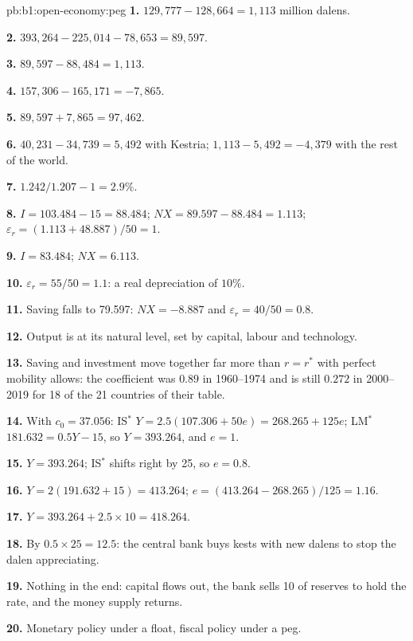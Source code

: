 \begin{solution}{pb:b1:open-economy:peg}
\textbf{1.} $129{,}777 - 128{,}664 = 1{,}113$ million dalens.

\textbf{2.} $393{,}264 - 225{,}014 - 78{,}653 = 89{,}597$.

\textbf{3.} $89{,}597 - 88{,}484 = 1{,}113$.

\textbf{4.} $157{,}306 - 165{,}171 = -7{,}865$.

\textbf{5.} $89{,}597 + 7{,}865 = 97{,}462$.

\textbf{6.} $40{,}231 - 34{,}739 = 5{,}492$ with Kestria; $1{,}113 - 5{,}492 = -4{,}379$ with the rest of the world.

\textbf{7.} $1.242/1.207 - 1 = 2.9\%$.

\textbf{8.} $I = 103.484 - 15 = 88.484$; $NX = 89.597 - 88.484 = 1.113$; $\varepsilon_r = (1.113 + 48.887)/50 = 1$.

\textbf{9.} $I = 83.484$; $NX = 6.113$.

\textbf{10.} $\varepsilon_r = 55/50 = 1.1$: a real depreciation of $10\%$.

\textbf{11.} Saving falls to 79.597: $NX = -8.887$ and $\varepsilon_r = 40/50 = 0.8$.

\textbf{12.} Output is at its natural level, set by capital, labour and
technology.

\textbf{13.} Saving and investment move together far more than $r = r^*$ with
perfect mobility allows: the coefficient was $0.89$ in 1960--1974 and is still
$0.272$ in 2000--2019 for 18 of the 21 countries of their table.

\textbf{14.} With $c_0 = 37.056$: IS$^*$ $Y = 2.5(107.306 + 50e) = 268.265 + 125e$; LM$^*$ $181.632 = 0.5Y - 15$, so
$Y = 393.264$, and $e = 1$.

\textbf{15.} $Y = 393.264$; IS$^*$ shifts right by 25, so $e = 0.8$.

\textbf{16.} $Y = 2(191.632 + 15) = 413.264$; $e = (413.264 - 268.265)/125 = 1.16$.

\textbf{17.} $Y = 393.264 + 2.5 \times 10 = 418.264$.

\textbf{18.} By $0.5 \times 25 = 12.5$: the central bank buys kests with new dalens to stop
the dalen appreciating.

\textbf{19.} Nothing in the end: capital flows out, the bank sells 10 of
reserves to hold the rate, and the money supply returns.

\textbf{20.} Monetary policy under a float, fiscal policy under a peg.


\end{solution}
